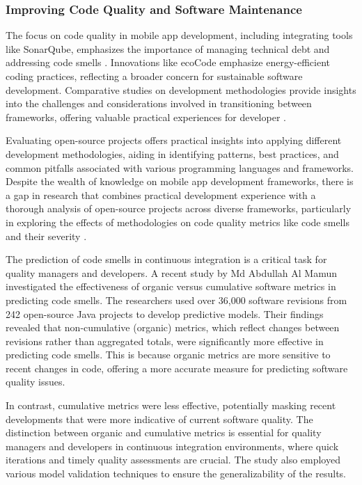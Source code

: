 \subsubsection*{Improving Code Quality and Software Maintenance}
The focus on code quality in mobile app development, including integrating tools like SonarQube, emphasizes the importance of managing technical debt and addressing code smells \cite{hecht2015detecting}. Innovations like ecoCode emphasize energy-efficient coding practices, reflecting a broader concern for sustainable software development. Comparative studies on development methodologies provide insights into the challenges and considerations involved in transitioning between frameworks, offering valuable practical experiences for developer \cite{lamothe2020a3}.
\par
Evaluating open-source projects offers practical insights into applying different development methodologies, aiding in identifying patterns, best practices, and common pitfalls associated with various programming languages and frameworks. Despite the wealth of knowledge on mobile app development frameworks, there is a gap in research that combines practical development experience with a thorough analysis of open-source projects across diverse frameworks, particularly in exploring the effects of methodologies on code quality metrics like code smells and their severity \cite{ardito2020effectiveness}.
\par
The prediction of code smells in continuous integration is a critical task for quality managers and developers. A recent study by Md Abdullah Al Mamun \cite{mamunimproving} investigated the effectiveness of organic versus cumulative software metrics in predicting code smells. The researchers used over 36,000 software revisions from 242 open-source Java projects to develop predictive models. Their findings revealed that non-cumulative (organic) metrics, which reflect changes between revisions rather than aggregated totals, were significantly more effective in predicting code smells. This is because organic metrics are more sensitive to recent changes in code, offering a more accurate measure for predicting software quality issues.
\par
In contrast, cumulative metrics were less effective, potentially masking recent developments that were more indicative of current software quality. The distinction between organic and cumulative metrics is essential for quality managers and developers in continuous integration environments, where quick iterations and timely quality assessments are crucial. The study also employed various model validation techniques to ensure the generalizability of the results.

